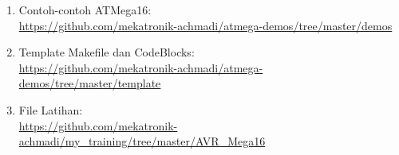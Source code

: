 \documentclass[12pt,]{article}
\begin{document}
	\begin{enumerate}
		\item Contoh-contoh ATMega16:\\
		\url{https://github.com/mekatronik-achmadi/atmega-demos/tree/master/demos}

		\item Template Makefile dan CodeBlocks:\\
		\url{https://github.com/mekatronik-achmadi/atmega-demos/tree/master/template}

		\item File Latihan:\\
		\url{https://github.com/mekatronik-achmadi/my_training/tree/master/AVR_Mega16}
	\end{enumerate}
\end{document}
